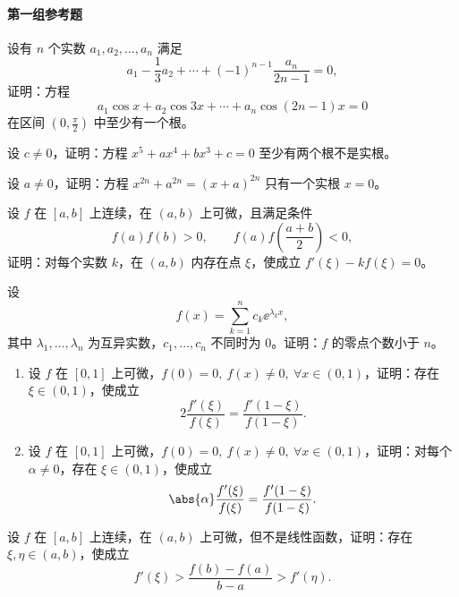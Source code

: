 \paragraph{第一组参考题}

\begin{xreferenceproblem}[1]
设有 $n$ 个实数 $a_1,a_2,\ldots,a_n$ 满足
\[
  a_1-\frac13a_2+\cdots+(-1)^{n-1}\frac{a_n}{2n-1}=0,
\]
证明：方程
\[
  a_1\cos x+a_2\cos3x+\cdots+a_n\cos(2n-1)x=0
\]
在区间 $\left(0,\frac{\pi}{2}\right)$ 中至少有一个根。
\end{xreferenceproblem}

\begin{xreferenceproblem}[2]
设 $c\neq0$，证明：方程 $x^5+ax^4+bx^3+c=0$ 至少有两个根不是实根。
\end{xreferenceproblem}

\begin{xreferenceproblem}[3]
设 $a\neq0$，证明：方程 $x^{2n}+a^{2n}=(x+a)^{2n}$ 只有一个实根 $x=0$。
\end{xreferenceproblem}

\begin{xreferenceproblem}[4]
设 $f$ 在 $[a,b]$ 上连续，在 $(a,b)$ 上可微，且满足条件
\[
  f(a)f(b)>0,\qquad f(a)f\left(\frac{a+b}{2}\right)<0,
\]
证明：对每个实数 $k$，在 $(a,b)$ 内存在点 $\xi$，使成立 $f'(\xi)-kf(\xi)=0$。
\end{xreferenceproblem}

\begin{xreferenceproblem}[5]
设
\[
  f(x)=\sum_{k=1}^n c_k\ee^{\lambda_kx},
\]
其中 $\lambda_1,\ldots,\lambda_n$ 为互异实数，$c_1,\ldots,c_n$ 不同时为 0。证明：$f$ 的零点个数小于 $n$。
\end{xreferenceproblem}

\begin{xreferenceproblem}[6]
\begin{enumerate}[label=(\arabic*)]
  \item 设 $f$ 在 $[0,1]$ 上可微，$f(0)=0,\ f(x)\neq0,\ \forall x\in(0,1)$，证明：存在 $\xi\in(0,1)$，使成立
  \[
    2\frac{f'(\xi)}{f(\xi)}=\frac{f'(1-\xi)}{f(1-\xi)}.
  \]
  \item 设 $f$ 在 $[0,1]$ 上可微，$f(0)=0,\ f(x)\neq0,\ \forall x\in(0,1)$，证明：对每个 $\alpha\neq0$，存在 $\xi\in(0,1)$，使成立
  \[
    \abs{\alpha}\frac{f'(\xi)}{f(\xi)}=\frac{f'(1-\xi)}{f(1-\xi)}.
  \]
\end{enumerate}
\end{xreferenceproblem}

\begin{xreferenceproblem}[7]
设 $f$ 在 $[a,b]$ 上连续，在 $(a,b)$ 上可微，但不是线性函数，证明：存在 $\xi,\eta\in(a,b)$，使成立
\[
  f'(\xi)>\frac{f(b)-f(a)}{b-a}>f'(\eta).
\]
\end{xreferenceproblem}

